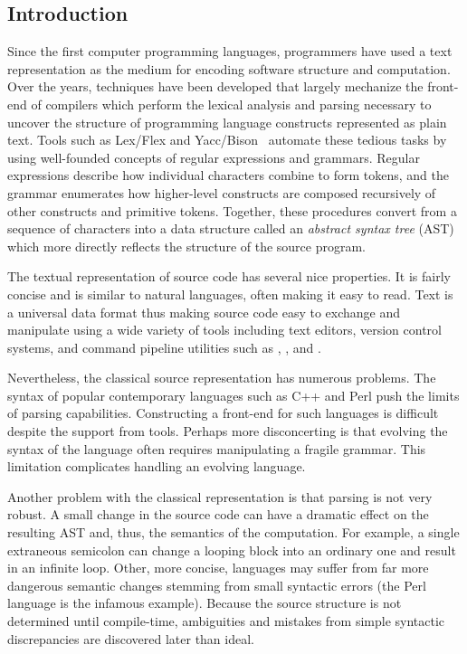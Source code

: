 \documentclass{article}
\begin{document}
\begin{multicols}{2}

\section{Introduction}
\label{sec-intro}

Since the first computer programming languages, programmers have used a
text representation as the medium for encoding software structure and
computation.  Over the years, techniques have been developed that
largely mechanize the front-end of compilers which perform the lexical
analysis and parsing necessary to uncover the structure of programming
language constructs represented as plain text.  Tools such as Lex/Flex
and Yacc/Bison~\cite{Levine92} automate these tedious tasks by using
well-founded concepts of regular expressions and grammars. Regular
expressions describe how individual characters combine to form tokens,
and the grammar enumerates how higher-level constructs are composed
recursively of other constructs and primitive tokens.  Together, these
procedures convert from a sequence of characters into a data structure
called an \emph{abstract syntax tree} (AST) which more directly reflects
the structure of the source program.

The textual representation of source code has several nice properties.
It is fairly concise and is similar to natural languages, often making it
easy to read.  Text is a universal data format thus making source code
easy to exchange and manipulate using a wide variety of tools including
text editors, version control systems, and command pipeline utilities
such as , , and .

Nevertheless, the classical source representation has numerous problems.
The syntax of popular contemporary languages such as C++ and Perl push
the limits of parsing capabilities.  Constructing a front-end for such
languages is difficult despite the support from tools.  Perhaps more
disconcerting is that evolving the syntax of the language often requires
manipulating a fragile grammar.  This limitation complicates handling an
evolving language.

Another problem with the classical representation is that parsing is not
very robust.  A small change in the source code can have a dramatic
effect on the resulting AST and, thus, the semantics of the computation.
For example, a single extraneous semicolon can change a looping block
into an ordinary one and result in an infinite loop.
Other, more concise, languages may suffer from far more dangerous
semantic changes stemming from small syntactic errors (the Perl language
is the infamous example).  Because the source structure is not
determined until compile-time, ambiguities and mistakes from simple
syntactic discrepancies are discovered later than ideal.


\end{multicols}
\end{document}
